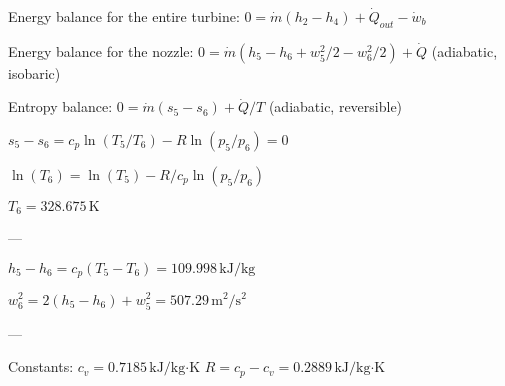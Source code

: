 Energy balance for the entire turbine:  
\( 0 = \dot{m} (h_2 - h_4) + \dot{Q}_{out} - \dot{w}_b \)  

Energy balance for the nozzle:  
\( 0 = \dot{m} (h_5 - h_6 + w_5^2 / 2 - w_6^2 / 2) + \dot{Q} \) (adiabatic, isobaric)  

Entropy balance:  
\( 0 = \dot{m} (s_5 - s_6) + \dot{Q} / T \) (adiabatic, reversible)  

\( s_5 - s_6 = c_p \ln(T_5 / T_6) - R \ln(p_5 / p_6) = 0 \)  

\( \ln(T_6) = \ln(T_5) - R / c_p \ln(p_5 / p_6) \)  

\( T_6 = 328.675 \, \text{K} \)  

---

\( h_5 - h_6 = c_p (T_5 - T_6) = 109.998 \, \text{kJ/kg} \)  

\( w_6^2 = 2 (h_5 - h_6) + w_5^2 = 507.29 \, \text{m}^2/\text{s}^2 \)  

---

Constants:  
\( c_v = 0.7185 \, \text{kJ/kg·K} \)  
\( R = c_p - c_v = 0.2889 \, \text{kJ/kg·K} \)